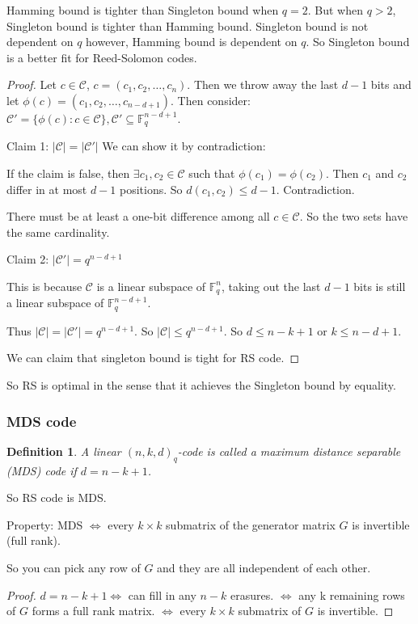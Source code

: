 \documentclass[letterpaper,12pt]{article}
\newtheorem{definition}{Definition}
\begin{document}
Hamming bound is tighter than Singleton bound when $q=2$. But when $q>2$,
Singleton bound is tighter than Hamming bound. Singleton bound is not dependent
on $q$ however, Hamming bound is dependent on $q$. So Singleton bound is a
better fit for Reed-Solomon codes.
\begin{proof}
    Let $c\in\mathcal{C}$, $c=(c_1,c_2,\ldots,c_n)$. Then we throw away the last $d-1$ bits and let $\phi(c)=(c_1,c_2,\ldots,c_{n-d+1})$. Then consider: $\mathcal{C}'=\{\phi(c):c\in\mathcal{C}\},\mathcal{C}'\subseteq \mathbb{F}_q^{n-d+1}$.

    Claim 1: $|\mathcal{C}|=|\mathcal{C}'|$ We can show it by contradiction:

    If the claim is false, then $\exists c_1,c_2\in \mathcal{C}$ such that
    $\phi(c_1)=\phi(c_2)$. Then $c_1$ and $c_2$ differ in at most $d-1$ positions.
    So $d(c_1,c_2)\le d-1$. Contradiction.

    There must be at least a one-bit difference among all $c\in \mathcal{C}$. So
    the two sets have the same cardinality.

    Claim 2: $|\mathcal{C}'|=q^{n-d+1}$

    This is because $\mathcal{C}$ is a linear subspace of $\mathbb{F}_q^n$, taking
    out the last $d-1$ bits is still a linear subspace of $\mathbb{F}_q^{n-d+1}$.

    Thus $|\mathcal{C}|=|\mathcal{C}'|=q^{n-d+1}$. So $|\mathcal{C}|\le q^{n-d+1}$.
    So $d\le n-k+1$ or $k\le n-d+1$.

    We can claim that singleton bound is tight for RS code.
\end{proof}
So RS is optimal in the sense that it achieves the Singleton bound by equality.
\subsubsection{MDS code}
\begin{definition}
    A linear $(n,k,d)_q$-code is called a maximum distance separable (MDS) code if $d=n-k+1$.
\end{definition}
So RS code is MDS.

Property: MDS $\iff$ every $k\times k$ submatrix of the generator matrix $G$ is
invertible (full rank).

So you can pick any row of $G$ and they are all independent of each other.

\begin{proof}
    $d=n-k+1\iff$ can fill in any $n-k$ erasures. $\iff$ any k remaining rows of $G$ forms a full rank matrix. $\iff$ every $k\times k$ submatrix of $G$ is invertible.
\end{proof}
\end{document}
